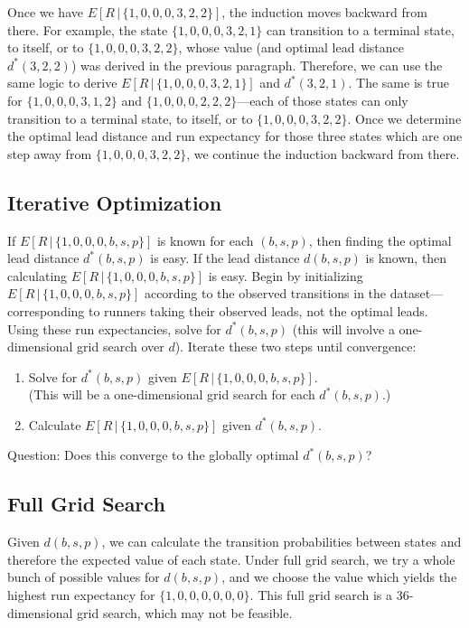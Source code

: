 \documentclass{article}
\begin{document}
    Once we have $E[R\, |\, \{1, 0, 0, 0, 3, 2, 2\}]$, the induction moves backward from there. For example, the state $\{1, 0, 0, 0, 3, 2, 1\}$ can transition to a terminal state, to itself, or to $\{1, 0, 0, 0, 3, 2, 2\}$, whose value (and optimal lead distance $d^*(3, 2, 2)$) was derived in the previous paragraph. Therefore, we can use the same logic to derive $E[R\, |\, \{1, 0, 0, 0, 3, 2, 1\}]$ and $d^*(3, 2, 1)$. The same is true for $\{1, 0, 0, 0, 3, 1, 2\}$ and $\{1, 0, 0, 0, 2, 2, 2\}$---each of those states can only transition to a terminal state, to itself, or to $\{1, 0, 0, 0, 3, 2, 2\}$. Once we determine the optimal lead distance and run expectancy for those three states which are one step away from $\{1, 0, 0, 0, 3, 2, 2\}$, we continue the induction backward from there.
    
    \subsection{Iterative Optimization}
    
    If $E[R\, |\, \{1, 0, 0, 0, b, s, p\}]$ is known for each $(b, s, p)$, then finding the optimal lead distance $d^*(b, s, p)$ is easy. If the lead distance $d(b, s, p)$ is known, then calculating $E[R\, |\, \{1, 0, 0, 0, b, s, p\}]$ is easy. Begin by initializing $E[R\, |\, \{1, 0, 0, 0, b, s, p\}]$ according to the observed transitions in the dataset---corresponding to runners taking their observed leads, not the optimal leads. Using these run expectancies, solve for $d^*(b, s, p)$ (this will involve a one-dimensional grid search over $d$). Iterate these two steps until convergence:
    \begin{enumerate}
        \item Solve for $d^*(b, s, p)$ given $E[R\, |\, \{1, 0, 0, 0, b, s, p\}]$.\\
        (This will be a one-dimensional grid search for each $d^*(b, s, p)$.)
        \item Calculate $E[R\, |\, \{1, 0, 0, 0, b, s, p\}]$ given $d^*(b, s, p)$.
    \end{enumerate}
    Question: Does this converge to the globally optimal $d^*(b, s, p)$?
    
    \subsection{Full Grid Search}
    Given $d(b, s, p)$, we can calculate the transition probabilities between states and therefore the expected value of each state. Under full grid search, we try a whole bunch of possible values for $d(b, s, p)$, and we choose the value which yields the highest run expectancy for $\{1, 0, 0, 0, 0, 0, 0\}$. This full grid search is a 36-dimensional grid search, which may not be feasible.
\end{document}
